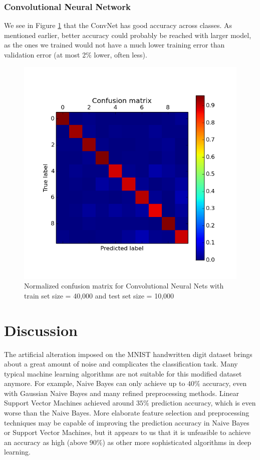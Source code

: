 \documentclass{acm_proc_article-sp}
\begin{document}
\subsubsection{Convolutional Neural Network}
We see in Figure \ref{fig:conv_conf} that the ConvNet has good accuracy across classes. As mentioned earlier, better accuracy could probably be reached with larger model, as the ones we trained would not have a much lower training error than validation error (at most 2$\%$ lower, often less).

\begin{figure} 
\centering
\includegraphics[width=0.8\columnwidth]{graphs/conv_conf.png}  
\caption{Normalized confusion matrix for Convolutional Neural Nets with train set size = 40,000 and test set size = 10,000}
\label{fig:conv_conf}
\end{figure}


\section{Discussion}
The artificial alteration imposed on the MNIST handwritten digit dataset brings about a great amount of noise and complicates the classification task. Many typical machine learning algorithms are not suitable for this modified dataset anymore. For example, Naive Bayes can only achieve up to  $40 \%$ accuracy, even with Gaussian Naive Bayes and many refined preprocessing methods.  Linear Support Vector Machines achieved around $35\%$ prediction accuracy, which is even  worse  than the Naive Bayes. More elaborate feature selection and preprocessing techniques may be capable of improving the prediction accuracy in Naive Bayes or Support Vector Machines, but it appears to us that it is unfeasible to achieve an accuracy as high (above $90 \%$) as other more sophisticated algorithms in deep learning.
\end{document}
